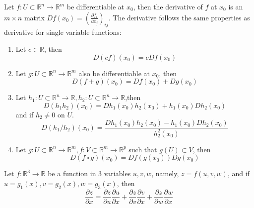 \documentclass[openany]{book}
\newcommand{\R}{\mathbb{R}}
\begin{document}
\begin{prop}
    Let $f:U\subset\R^n\to\R^m$ be differentiable at $x_0$, then the derivative of $f$ at $x_0$ is an $m\times n$ matrix $Df(x_0)=\left(\frac{\partial f_i}{\partial x_j}\right)_{ij}$. The derivative follows the same properties as derivative for single variable functions:
    \begin{enumerate}
        \item Let $c\in\R$, then 
        \begin{equation*}
            D(cf)(x_0)=cDf(x_0) \tag {multiplication of a matrix by constant $c$}
        \end{equation*}
        \item Let $g: U\subset\R^n\to\R^m$ also be differentiable at $x_0$, then 
        \begin{equation*}
            D(f+g)(x_0)=Df(x_0)+Dg(x_0) \tag{sum of two matrices}
        \end{equation*}
        \item Let $h_1: U\subset\R^n\to\R, h_2: U\subset\R^n\to\R$,then 
        \begin{equation*}
            D(h_1h_2)(x_0)=Dh_1(x_0)h_2(x_0)+h_1(x_0)Dh_2(x_0) \tag{product rule}
        \end{equation*}
        and if $h_2\neq 0$ on $U$.
        \begin{equation*}
            D(h_1/h_2)(x_0)=\frac{Dh_1(x_0)h_2(x_0)-h_1(x_0)Dh_2(x_0)}{h_2^2(x_0)} \tag{quotient rule}
        \end{equation*}
        \item Let $g: U\subset\R^n\to\R^m, f:V\subset\R^m\to\R^p$ such that $g(U)\subset V$, then 
        \begin{equation*}
            D(f\circ g)(x_0)=Df(g(x_0))Dg(x_0) \tag{chain rule}
        \end{equation*}
    \end{enumerate}
\end{prop}

\begin{prop}
    Let $f:\R^3\to\R$ be a function in $3$ variables $u,v,w$, namely, $z=f(u,v,w)$, and if $u=g_1(x), v=g_2(x), w=g_3(x)$, then 
    \begin{equation*}
        \frac{\partial z}{\partial x}=\frac{\partial z}{\partial u}\frac{\partial u}{\partial x}+\frac{\partial z}{\partial v}\frac{\partial v}{\partial x}+\frac{\partial z}{\partial w}\frac{\partial w}{\partial x}
    \end{equation*}
\end{prop}
\end{document}
